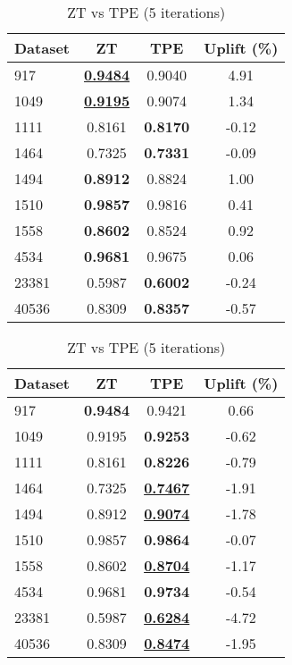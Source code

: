 \begin{table}[htbp]
\begin{center}
\begin{small}
\begin{sc}
\begin{subtable}[t]{0.48\textwidth}
    \centering
    \caption{ZT vs TPE (1 iteration)}
    \label{tab:randomforest-zt-vs-tpe-1}
    \begin{tabular}{lccc}
    \toprule
    \textbf{Dataset} & \textbf{ZT} & \textbf{TPE} & \textbf{Uplift (\%)} \\
    \midrule
    917    & \underline{\textbf{0.9484}} & 0.9040 & 4.91 \\
    1049    & \underline{\textbf{0.9195}} & 0.9074 & 1.34 \\
    1111    & 0.8161 & \textbf{0.8170} & -0.12 \\
    1464    & 0.7325 & \textbf{0.7331} & -0.09 \\
    1494    & \textbf{0.8912} & 0.8824 & 1.00 \\
    1510    & \textbf{0.9857} & 0.9816 & 0.41 \\
    1558    & \textbf{0.8602} & 0.8524 & 0.92 \\
    4534    & \textbf{0.9681} & 0.9675 & 0.06 \\
    23381    & 0.5987 & \textbf{0.6002} & -0.24 \\
    40536    & 0.8309 & \textbf{0.8357} & -0.57 \\
    \bottomrule
    \end{tabular}
\end{subtable}
\hfill
\begin{subtable}[t]{0.48\textwidth}
    \centering
    \caption{ZT vs TPE (5 iterations)}
    \label{tab:randomforest-zt-vs-tpe-5}
    \begin{tabular}{lccc}
    \toprule
    \textbf{Dataset} & \textbf{ZT} & \textbf{TPE} & \textbf{Uplift (\%)} \\
    \midrule
    917    & \textbf{0.9484} & 0.9421 & 0.66 \\
    1049    & 0.9195 & \textbf{0.9253} & -0.62 \\
    1111    & 0.8161 & \textbf{0.8226} & -0.79 \\
    1464    & 0.7325 & \underline{\textbf{0.7467}} & -1.91 \\
    1494    & 0.8912 & \underline{\textbf{0.9074}} & -1.78 \\
    1510    & 0.9857 & \textbf{0.9864} & -0.07 \\
    1558    & 0.8602 & \underline{\textbf{0.8704}} & -1.17 \\
    4534    & 0.9681 & \textbf{0.9734} & -0.54 \\
    23381    & 0.5987 & \underline{\textbf{0.6284}} & -4.72 \\
    40536    & 0.8309 & \underline{\textbf{0.8474}} & -1.95 \\
    \bottomrule
    \end{tabular}
\end{subtable}


\end{sc}
\end{small}
\end{center}
\end{table}
